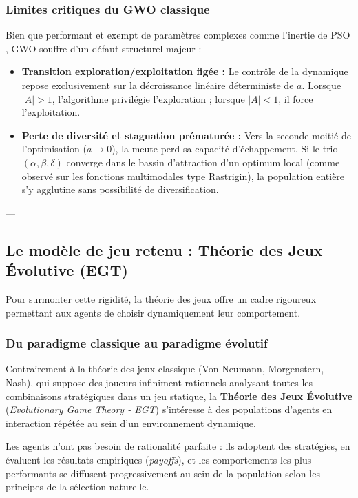 \subsubsection{Limites critiques du GWO classique}
Bien que performant et exempt de paramètres complexes comme l'inertie de PSO \cite{kennedy1995particle}, GWO souffre d'un défaut structurel majeur :
\begin{itemize}
    \item \textbf{Transition exploration/exploitation figée :} Le contrôle de la dynamique repose exclusivement sur la décroissance linéaire déterministe de $a$. Lorsque $|A| > 1$, l'algorithme privilégie l'exploration ; lorsque $|A| < 1$, il force l'exploitation. 
    \item \textbf{Perte de diversité et stagnation prématurée :} Vers la seconde moitié de l'optimisation ($a \to 0$), la meute perd sa capacité d'échappement. Si le trio $(\alpha, \beta, \delta)$ converge dans le bassin d'attraction d'un optimum local (comme observé sur les fonctions multimodales type Rastrigin), la population entière s'y agglutine sans possibilité de diversification.
\end{itemize}

---

\subsection{Le modèle de jeu retenu : Théorie des Jeux Évolutive (EGT)}

Pour surmonter cette rigidité, la théorie des jeux offre un cadre rigoureux permettant aux agents de choisir dynamiquement leur comportement.

\subsubsection{Du paradigme classique au paradigme évolutif}
Contrairement à la théorie des jeux classique (Von Neumann, Morgenstern, Nash), qui suppose des joueurs infiniment rationnels analysant toutes les combinaisons stratégiques dans un jeu statique, la \textbf{Théorie des Jeux Évolutive} (\textit{Evolutionary Game Theory - EGT}) \cite{weibull1995evolutionary} s'intéresse à des populations d'agents en interaction répétée au sein d'un environnement dynamique. 

Les agents n'ont pas besoin de rationalité parfaite : ils adoptent des stratégies, en évaluent les résultats empiriques (\textit{payoffs}), et les comportements les plus performants se diffusent progressivement au sein de la population selon les principes de la sélection naturelle.

